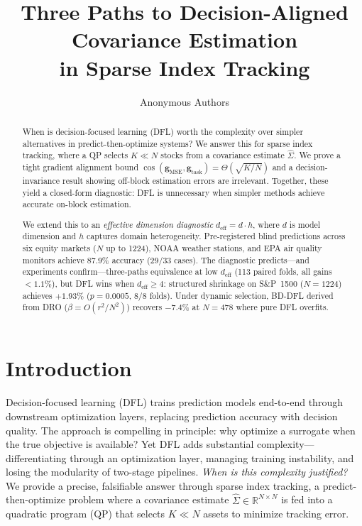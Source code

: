 \documentclass[letterpaper]{article}
\title{Three Paths to Decision-Aligned Covariance Estimation\\in Sparse Index Tracking}
\author{
  Anonymous Authors
}
\begin{document}
\maketitle

\begin{abstract}
When is decision-focused learning (DFL) worth the complexity over simpler alternatives in predict-then-optimize systems? We answer this for sparse index tracking, where a QP selects $K \ll N$ stocks from a covariance estimate $\hat{\Sigma}$. We prove a tight gradient alignment bound $\cos(\mathbf{g}_{\text{MSE}}, \mathbf{g}_{\text{task}}) = \Theta(\sqrt{K/N})$ and a decision-invariance result showing off-block estimation errors are irrelevant. Together, these yield a closed-form diagnostic: DFL is unnecessary when simpler methods achieve accurate on-block estimation.

We extend this to an \emph{effective dimension diagnostic} $d_{\text{eff}} = d \cdot h$, where $d$ is model dimension and $h$ captures domain heterogeneity. Pre-registered blind predictions across six equity markets ($N$ up to 1224), NOAA weather stations, and EPA air quality monitors achieve 87.9\% accuracy (29/33 cases). The diagnostic predicts---and experiments confirm---three-paths equivalence at low $d_{\text{eff}}$ (113 paired folds, all gains $< 1.1\%$), but DFL wins when $d_{\text{eff}} \geq 4$: structured shrinkage on S\&P~1500 ($N{=}1224$) achieves $+1.93\%$ ($p{=}0.0005$, 8/8 folds). Under dynamic selection, BD-DFL derived from DRO ($\beta = O(r^2/N^2)$) recovers $-7.4\%$ at $N{=}478$ where pure DFL overfits.
\end{abstract}

\section{Introduction}

Decision-focused learning (DFL) \citep{elmachtoub2022smart,donti2017task} trains prediction models end-to-end through downstream optimization layers, replacing prediction accuracy with decision quality. The approach is compelling in principle: why optimize a surrogate when the true objective is available? Yet DFL adds substantial complexity---differentiating through an optimization layer, managing training instability, and losing the modularity of two-stage pipelines. \emph{When is this complexity justified?} We provide a precise, falsifiable answer through sparse index tracking, a predict-then-optimize problem where a covariance estimate $\hat\Sigma \in \mathbb{R}^{N \times N}$ is fed into a quadratic program (QP) that selects $K \ll N$ assets to minimize tracking error.
\end{document}
